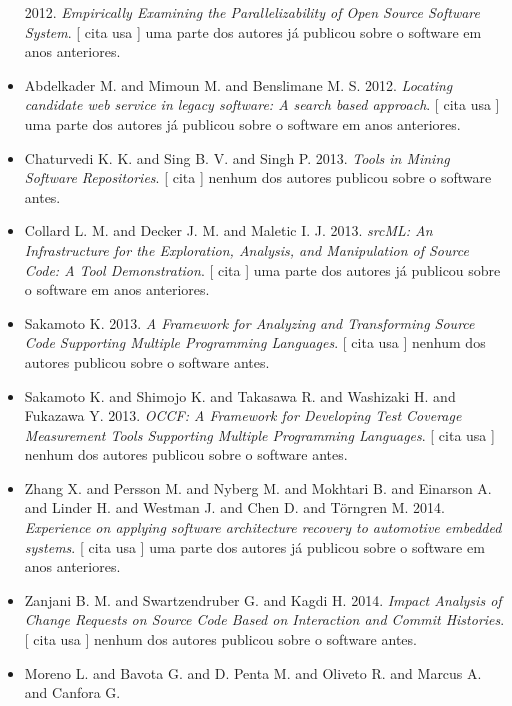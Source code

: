 \begin{itemize}
      2012.
        \textit{ Empirically Examining the Parallelizability of Open Source Software System}.
      [
          cita
          usa
      ]
uma parte dos autores já publicou sobre o software em anos anteriores.
\item Abdelkader M. and Mimoun M. and Benslimane M. S.
      2012.
        \textit{ Locating candidate web service in legacy software: A search based approach}.
      [
          cita
          usa
      ]
uma parte dos autores já publicou sobre o software em anos anteriores.
\item Chaturvedi K. K. and Sing B. V. and Singh P.
      2013.
        \textit{ Tools in Mining Software Repositories}.
      [
          cita
      ]
nenhum dos autores publicou sobre o software antes.
\item Collard L. M. and Decker J. M. and Maletic I. J.
      2013.
        \textit{ srcML: An Infrastructure for the Exploration, Analysis, and Manipulation of Source Code: A Tool Demonstration}.
      [
          cita
      ]
uma parte dos autores já publicou sobre o software em anos anteriores.
\item Sakamoto K.
      2013.
        \textit{ A Framework for Analyzing and Transforming Source Code Supporting Multiple Programming Languages}.
      [
          cita
          usa
      ]
nenhum dos autores publicou sobre o software antes.
\item Sakamoto K. and Shimojo K. and Takasawa R. and Washizaki H. and Fukazawa Y.
      2013.
        \textit{ OCCF: A Framework for Developing Test Coverage Measurement Tools Supporting Multiple Programming Languages}.
      [
          cita
          usa
      ]
nenhum dos autores publicou sobre o software antes.
\item Zhang X. and Persson M. and Nyberg M. and Mokhtari B. and Einarson A. and Linder H. and Westman J. and Chen D. and Törngren M.
      2014.
        \textit{ Experience on applying software architecture recovery to automotive embedded systems}.
      [
          cita
          usa
      ]
uma parte dos autores já publicou sobre o software em anos anteriores.
\item Zanjani B. M. and Swartzendruber G. and Kagdi H.
      2014.
        \textit{ Impact Analysis of Change Requests on Source Code Based on Interaction and Commit Histories}.
      [
          cita
          usa
      ]
nenhum dos autores publicou sobre o software antes.
\item Moreno L. and Bavota G. and D. Penta M. and Oliveto R. and Marcus A. and Canfora G.

\end{itemize}
